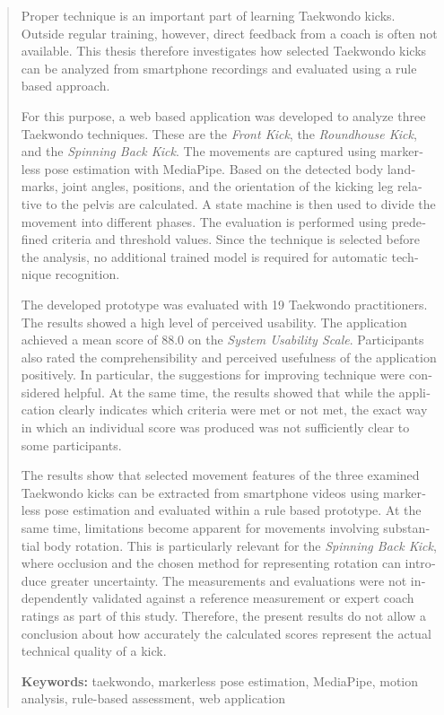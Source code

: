 \documentclass[intern]{cgMA}
\begin{document}
\begin{otherlanguage}{english}
\begin{abstract}
Proper technique is an important part of learning Taekwondo kicks. Outside regular training, however, direct feedback from a coach is often not available. This thesis therefore investigates how selected Taekwondo kicks can be analyzed from smartphone recordings and evaluated using a rule based approach.

For this purpose, a web based application was developed to analyze three Taekwondo techniques. These are the \textit{Front Kick}, the \textit{Roundhouse Kick}, and the \textit{Spinning Back Kick}. The movements are captured using markerless pose estimation with MediaPipe. Based on the detected body landmarks, joint angles, positions, and the orientation of the kicking leg relative to the pelvis are calculated. A state machine is then used to divide the movement into different phases. The evaluation is performed using predefined criteria and threshold values. Since the technique is selected before the analysis, no additional trained model is required for automatic technique recognition.

The developed prototype was evaluated with 19 Taekwondo practitioners. The results showed a high level of perceived usability. The application achieved a mean score of 88.0 on the \textit{System Usability Scale}. Participants also rated the comprehensibility and perceived usefulness of the application positively. In particular, the suggestions for improving technique were considered helpful. At the same time, the results showed that while the application clearly indicates which criteria were met or not met, the exact way in which an individual score was produced was not sufficiently clear to some participants.

The results show that selected movement features of the three examined Taekwondo kicks can be extracted from smartphone videos using markerless pose estimation and evaluated within a rule based prototype. At the same time, limitations become apparent for movements involving substantial body rotation. This is particularly relevant for the \textit{Spinning Back Kick}, where occlusion and the chosen method for representing rotation can introduce greater uncertainty. The measurements and evaluations were not independently validated against a reference measurement or expert coach ratings as part of this study. Therefore, the present results do not allow a conclusion about how accurately the calculated scores represent the actual technical quality of a kick.

\bigskip
\noindent\textbf{Keywords:} taekwondo, markerless pose estimation, MediaPipe, motion analysis, rule-based assessment, web application
\end{abstract}
\end{otherlanguage}
\end{document}
